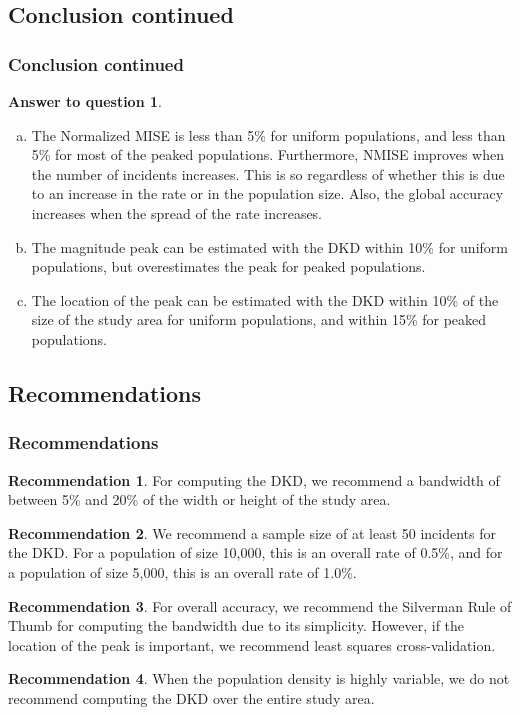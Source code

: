 \documentclass[notheorems]{beamer}
\theoremstyle{definition}
\newtheorem{answer}{Answer to question}
\theoremstyle{example}
\newtheorem{recommendation}{Recommendation}
\begin{document}
\subsection{Conclusion continued}
\begin{frame}\frametitle{Conclusion continued}
    \begin{answer}
        \begin{enumerate}[a)]
            \item
                The Normalized MISE is less than 5\% for uniform populations,
                and less than 5\% for most of the peaked populations.
                Furthermore, NMISE improves when the number of incidents increases.
                This is so regardless of whether this is due to an increase in the rate or in the population size.
                Also, the global accuracy increases when the spread of the rate increases.
            \item
                The magnitude peak can be estimated with the DKD within 10\% for uniform populations,
                but overestimates the peak for peaked populations.
            \item
                The location of the peak can be estimated with the DKD within 10\% of the size of the study area for uniform populations,
                and within 15\% for peaked populations.
        \end{enumerate}
    \end{answer}
\end{frame}

\subsection{Recommendations}
\begin{frame}\frametitle{Recommendations}
    \footnotesize
    \begin{recommendation}
        For computing the DKD,
        we recommend a bandwidth of between 5\% and 20\% of the width or height of the study area.
    \end{recommendation}
    \begin{recommendation}
        We recommend a sample size of at least 50 incidents for the DKD.
        For a population of size 10,000, this is an overall rate of 0.5\%,
        and for a population of size 5,000, this is an overall rate of 1.0\%.
    \end{recommendation}
    \begin{recommendation}
        For overall accuracy,
        we recommend the Silverman Rule of Thumb for computing the bandwidth due to its simplicity.
        However, if the location of the peak is important, we recommend least squares cross-validation.
    \end{recommendation}
    \begin{recommendation}
        When the population density is highly variable,
        we do not recommend computing the DKD over the entire study area.
    \end{recommendation}
\end{frame}
\end{document}
